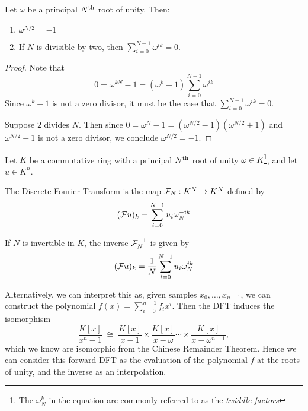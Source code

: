 \begin{lemma}\label{lem:rou-results}
    Let $\omega$ be a principal $N^{\textrm{th}}$ root of unity. Then:
    \begin{enumerate}
        \item $\omega^{N/2} = -1$
        \item If $N$ is divisible by two, then $\sum_{i = 0}^{N-1} \omega^{ik} = 0$.
    \end{enumerate}
\end{lemma}
\begin{proof}
    Note that
    \[
        0 = \omega^{kN} - 1 = (\omega^k - 1)\sum^{N-1}_{i=0} \omega^{ik}
    \]
    Since $\omega^k - 1$ is not a zero divisor, it must be the case that $\sum^{N-1}_{i=0} \omega^{ik} = 0$.

    Suppose $2$ divides $N$. Then since $0 = \omega^N - 1 = (\omega^{N/2} - 1)(\omega^{N/2} + 1)$ and $\omega^{N/2} - 1$ is not a zero divisor, we conclude $\omega^{N/2} = -1$.
\end{proof}


\begin{definition}
    Let $K$ be a commutative ring with a principal $N^{\textrm{th}}$ root of unity $\omega \in K$\footnote{The $\omega_N^k$ in the equation are commonly referred to as the \textit{twiddle factors}}, and let $u \in K^n$.

    The Discrete Fourier Transform is the map $\mathcal F_N : K^N \to K^N$ defined by
    \begin{equation}\label{eq:forward-dft}
        (\mathcal Fu)_k = \sum^{N-1}_{i=0}u_i\omega_{N}^{-ik}
    \end{equation}

    If $N$ is invertible in $K$, the inverse $\mathcal F_N^{-1}$ is given by
    \begin{equation}\label{eq:reverse-dft}
        (\mathcal Fu)_k = \frac{1}{N}\sum^{N-1}_{i=0}u_i\omega_N^{ik}
    \end{equation}
\end{definition}

Alternatively, we can interpret this as, given samples $x_0, \ldots, x_{n-1}$, we can construct the polynomial $f(x) = \sum_{i=0}^{n-1} f_i x^i$. Then the DFT induces the isomorphism
\begin{equation}\label{eq:fft-iso}
    \frac{K[x]}{x^n - 1} \; \cong \; \frac{K[x]}{x - 1} \times \frac{K[x]}{x - \omega} \cdots \times \frac{K[x]}{x - \omega^{n-1}},
\end{equation}
which we know are isomorphic from the Chinese Remainder Theorem.
Hence we can consider this forward DFT as the evaluation of the polynomial $f$ at the roots of unity, and the inverse as an interpolation.

